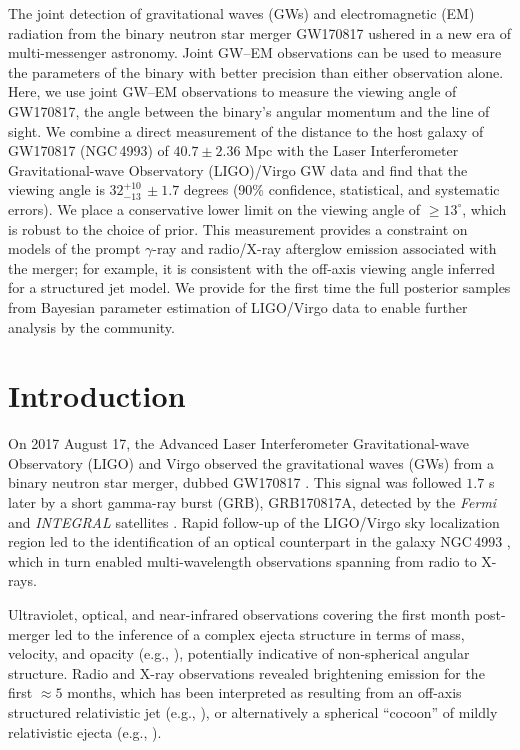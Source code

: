 The joint detection of gravitational waves (GWs) and electromagnetic (EM) radiation from the binary neutron star merger GW170817 ushered in a new era of multi-messenger astronomy. Joint GW--EM observations can be used to measure the parameters of the binary with better precision than either observation alone. Here, we use joint GW--EM observations to measure the viewing angle of GW170817, the angle between the binary's angular momentum and the line of sight. We combine a direct measurement of the distance to the host galaxy of GW170817 (NGC\,4993) of $40.7\pm 2.36$ Mpc with the Laser Interferometer Gravitational-wave Observatory (LIGO)/Virgo GW data and find that the viewing angle is $32^{+10}_{-13}\,\pm 1.7$ degrees (90\% confidence, statistical, and systematic errors). We place a conservative lower limit on the viewing angle of $\ge 13^\circ$, which is robust to the choice of prior. This measurement provides a constraint on models of the prompt $\gamma$-ray and radio/X-ray afterglow emission associated with the merger; for example, it is consistent with the off-axis viewing angle inferred for a structured jet model. We provide for the first time the full posterior samples from Bayesian parameter estimation of LIGO/Virgo data to enable further analysis by the community.

\section{Introduction}
On 2017 August 17, the Advanced Laser Interferometer Gravitational-wave Observatory (LIGO) and Virgo observed the gravitational waves (GWs) from a binary neutron star merger, dubbed GW170817 \cite{TheLIGOScientific:2017qsa}. This signal was followed $1.7$ s later by a short gamma-ray burst (GRB), GRB170817A, detected by the {\it Fermi} and {\it INTEGRAL} satellites \cite{Goldstein:2017mmi,Savchenko:2017ffs}. Rapid follow-up of the LIGO/Virgo sky localization region led to the identification of an optical counterpart in the galaxy NGC\,4993 \cite{Coulter:2017wya,Soares-Santos:2017lru,Valenti:2017ngx}, which in turn enabled multi-wavelength observations spanning from radio to X-rays. 

Ultraviolet, optical, and near-infrared observations covering the first month post-merger led to the inference of a complex ejecta structure in terms of mass, velocity, and opacity (e.g., \cite{Chornock:2017sdf,Cowperthwaite:2017dyu,Kasliwal:2017ngb,Nicholl:2017ahq,Pian:2017gtc,Smartt:2017fuw,Villar:2017wcc}), potentially indicative of non-spherical angular structure.  Radio and X-ray observations revealed brightening emission for the first $\approx 5$ months, which has been interpreted as resulting from an off-axis structured relativistic jet (e.g., \cite{Alexander:2017aly,Alexander2018,Lazzati:2017zsj,Margutti:2017cjl,Margutti:2018xqd}), or alternatively a spherical ``cocoon'' of mildly relativistic ejecta (e.g., \cite{Mooley:2017enz}).

